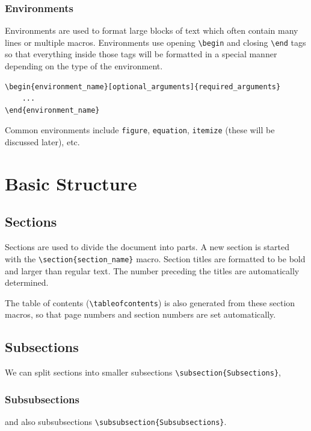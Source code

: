 \documentclass[11pt, twoside]{article}
\begin{document}
\subsubsection{Environments}
Environments are used to format large blocks of text which often contain many lines or multiple macros. Environments use opening \lstinline|\begin| and closing \lstinline|\end| tags so that everything inside those tags will be formatted in a special manner depending on the type of the environment.
\begin{lstlisting}
\begin{environment_name}[optional_arguments]{required_arguments}
    ...
\end{environment_name} 
\end{lstlisting}
Common environments include \lstinline{figure}, \lstinline{equation}, \lstinline{itemize} (these will be discussed later), etc.
\newpage
\section{Basic Structure}
\subsection{Sections}
Sections are used to divide the document into parts. A new section is started with the \lstinline|\section{section_name}| macro. Section titles are formatted to be bold and larger than regular text. The number preceding the titles are automatically determined.

The table of contents (\lstinline{\tableofcontents}) is also generated from these section macros, so that page numbers and section numbers are set automatically.
\subsection{Subsections}
We can split sections into smaller subsections \lstinline|\subsection{Subsections}|,
\subsubsection{Subsubsections}
and also subsubsections \lstinline|\subsubsection{Subsubsections}|.
\end{document}
